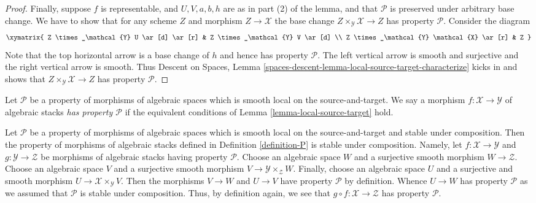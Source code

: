 \begin{proof}
\medskip\noindent
Finally, suppose $f$ is representable, and $U, V, a, b, h$ are
as in part (2) of the lemma, and that $\mathcal{P}$ is preserved under
arbitrary base change. We have to show that for any scheme
$Z$ and morphism $Z \to \mathcal{X}$ the base change
$Z \times_\mathcal{Y} \mathcal{X} \to Z$
has property $\mathcal{P}$. Consider the diagram
$$
\xymatrix{
Z \times_\mathcal{Y} U \ar[d] \ar[r] &
Z \times_\mathcal{Y} V \ar[d] \\
Z \times_\mathcal{Y} \mathcal{X} \ar[r] &
Z
}
$$
Note that the top horizontal arrow is a base change of $h$ and
hence has property $\mathcal{P}$. The left vertical arrow is smooth
and surjective and the right vertical arrow is smooth. Thus
Descent on Spaces,
Lemma \ref{spaces-descent-lemma-local-source-target-characterize}
kicks in and shows that $Z \times_\mathcal{Y} \mathcal{X} \to Z$
has property $\mathcal{P}$.
\end{proof}

\begin{definition}
\label{definition-P}
Let $\mathcal{P}$ be a property of morphisms of algebraic spaces
which is smooth local on the source-and-target.
We say a morphism $f : \mathcal{X} \to \mathcal{Y}$ of algebraic stacks
{\it has property $\mathcal{P}$} if the equivalent conditions of
Lemma \ref{lemma-local-source-target}
hold.
\end{definition}

\begin{remark}
\label{remark-composition}
Let $\mathcal{P}$ be a property of morphisms of algebraic spaces
which is smooth local on the source-and-target and stable under composition.
Then the property of morphisms of algebraic stacks defined in
Definition \ref{definition-P}
is stable under composition. Namely, let $f : \mathcal{X} \to \mathcal{Y}$
and $g : \mathcal{Y} \to \mathcal{Z}$ be morphisms of algebraic stacks
having property $\mathcal{P}$. Choose an algebraic space $W$ and a
surjective smooth morphism $W \to \mathcal{Z}$. Choose an algebraic space
$V$ and a surjective smooth morphism $V \to \mathcal{Y} \times_\mathcal{Z} W$.
Finally, choose an algebraic space $U$ and a surjective and smooth morphism
$U \to \mathcal{X} \times_\mathcal{Y} V$. Then the morphisms
$V \to W$ and $U \to V$ have property $\mathcal{P}$ by definition.
Whence $U \to W$ has property $\mathcal{P}$ as we assumed that
$\mathcal{P}$ is stable under composition. Thus, by definition again,
we see that $g \circ f : \mathcal{X} \to \mathcal{Z}$ has
property $\mathcal{P}$.
\end{remark}

